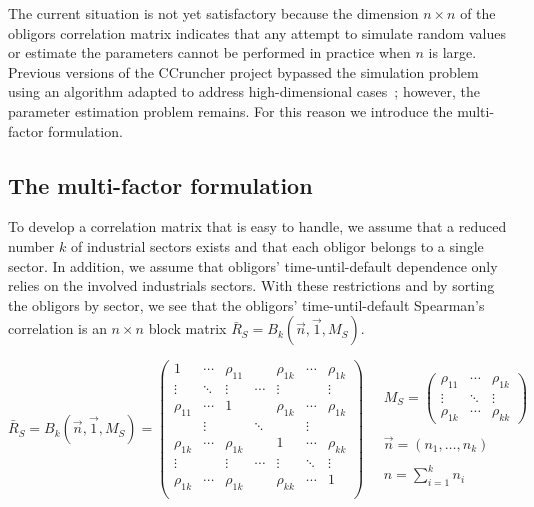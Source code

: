 \documentclass[11pt,fleqn]{book} %
\begin{document}
The current situation is not yet satisfactory because the dimension 
$n {\times} n$ of the obligors correlation matrix indicates that any 
attempt to simulate random values or estimate the parameters cannot 
be performed in practice when $n$ is large. Previous versions of the 
CCruncher project bypassed the simulation problem using an algorithm 
adapted to address high-dimensional cases~\cite{torrent:2011}; however, 
the parameter estimation problem remains. For this reason we introduce 
the multi-factor formulation.

\subsection{The multi-factor formulation}

To develop a correlation matrix that is easy to handle, we assume that a 
reduced number $k$ of industrial sectors exists and that each obligor belongs 
to a single sector. In addition, we assume that obligors' time-until-default 
dependence only relies on the involved industrials sectors. With these 
restrictions and by sorting the obligors by sector, we see that the obligors' 
time-until-default Spearman's correlation is an $n {\times} n$ block matrix 
$\bar{R}_S = B_k(\vec{n},\vec{1},M_S)$.

\begin{displaymath}
	\bar{R}_S = B_k(\vec{n},\vec{1},M_S) = 
	\left(
	\begin{array}{ccccccc}
		1         & \cdots & \rho_{11} &        & \rho_{1k} & \cdots & \rho_{1k} \\
		\vdots    & \ddots & \vdots    & \cdots & \vdots    &        & \vdots    \\
		\rho_{11} & \cdots & 1         &        & \rho_{1k} & \cdots & \rho_{1k} \\
		
		          & \vdots &           & \ddots &           & \vdots &           \\
		
		\rho_{1k} & \cdots & \rho_{1k} &        & 1         & \cdots & \rho_{kk} \\
		\vdots    &        & \vdots    & \cdots & \vdots    & \ddots & \vdots    \\
		\rho_{1k} & \cdots & \rho_{1k} &        & \rho_{kk} & \cdots & 1         \\
	\end{array}
	\right)
	\quad 
	\begin{array}{l}
		M_S = 
		\left(
		\begin{array}{ccc}
			\rho_{11} & \cdots & \rho_{1k} \\
			\vdots    & \ddots & \vdots    \\
			\rho_{1k} & \cdots & \rho_{kk}
		\end{array}
		\right) \\
		\\
		\vec{n} = (n_1,\dots,n_k) \\
		\\
		n = \displaystyle \sum_{i=1}^{k} n_i
	\end{array}
\end{displaymath}
\end{document}
